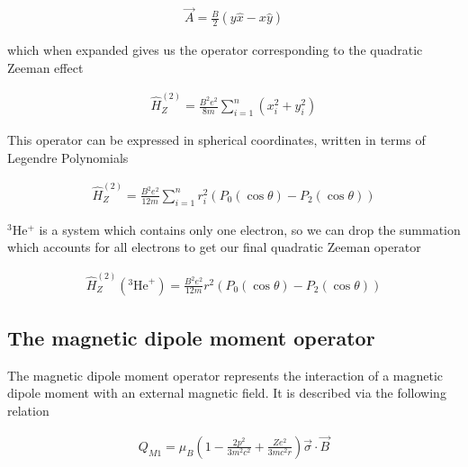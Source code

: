             \begin{align}
                \vec{A} = \frac{B}{2} \left( y\hat{x} - x\hat{y} \right)
            \end{align}

            \noindent which when expanded gives us the operator corresponding to the quadratic Zeeman effect

            \begin{align}
                \hat{H}_Z^{(2)} = \frac{B^2 e^2}{8m} \sum_{i = 1}^n (x_i^2 + y_i^2)
            \end{align}

            \noindent This operator can be expressed in spherical coordinates, written in terms of Legendre Polynomials

            \begin{align}
                \hat{H}^{(2)}_Z = \frac{B^2 e^2}{12m} \sum_{i = 1}^n r_i^2 \left( P_0(\cos \theta) - P_2(\cos \theta) \right)
            \end{align}

            \noindent $^3$He$^+$ is a system which contains only one electron, so we can drop the summation which accounts for all electrons to get our final quadratic Zeeman operator

            \begin{align}
                \hat{H}^{(2)}_Z(^3\text{He}^+) = \frac{B^2 e^2}{12m} r^2 \left( P_0(\cos \theta) - P_2(\cos \theta) \right)
            \end{align}

        \subsection{The magnetic dipole moment operator}\label{sec:magnetic_dipole_operator}
            The magnetic dipole moment operator represents the interaction of a magnetic dipole moment with an external magnetic field. It is described via the following relation

            \begin{align}
                Q_{M1} = \mu_B \left( 1 - \frac{2p^2}{3m^2 c^2} + \frac{Ze^2}{3mc^2r} \right) \vec{\sigma} \cdot \vec{B}
            \end{align}

